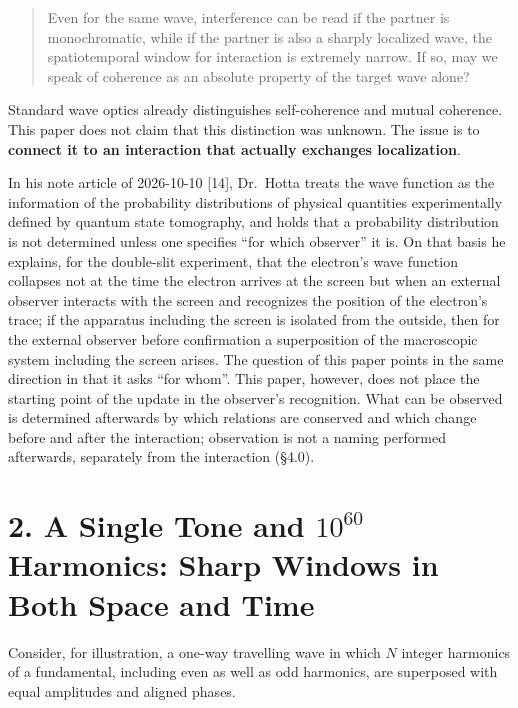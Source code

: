 \documentclass[
  a4paper,
]{article}
\begin{document}
\begin{quote}
Even for the same wave, interference can be read if the partner is
monochromatic, while if the partner is also a sharply localized wave,
the spatiotemporal window for interaction is extremely narrow. If so,
may we speak of coherence as an absolute property of the target wave
alone?
\end{quote}

Standard wave optics already distinguishes self-coherence and mutual
coherence. This paper does not claim that this distinction was unknown.
The issue is to \textbf{connect it to an interaction that actually
exchanges localization}.

In his note article of 2026-10-10 {[}14{]}, Dr.~Hotta treats the wave
function as the information of the probability distributions of physical
quantities experimentally defined by quantum state tomography, and holds
that a probability distribution is not determined unless one specifies
``for which observer'' it is. On that basis he explains, for the
double-slit experiment, that the electron's wave function collapses not
at the time the electron arrives at the screen but when an external
observer interacts with the screen and recognizes the position of the
electron's trace; if the apparatus including the screen is isolated from
the outside, then for the external observer before confirmation a
superposition of the macroscopic system including the screen arises. The
question of this paper points in the same direction in that it asks
``for whom''. This paper, however, does not place the starting point of
the update in the observer's recognition. What can be observed is
determined afterwards by which relations are conserved and which change
before and after the interaction; observation is not a naming performed
afterwards, separately from the interaction (§4.0).

\section{\texorpdfstring{2. A Single Tone and \(10^{60}\) Harmonics:
Sharp Windows in Both Space and
Time}{2. A Single Tone and 10\^{}\{60\} Harmonics: Sharp Windows in Both Space and Time}}\label{a-single-tone-and-1060-harmonics-sharp-windows-in-both-space-and-time}

Consider, for illustration, a one-way travelling wave in which \(N\)
integer harmonics of a fundamental, including even as well as odd
harmonics, are superposed with equal amplitudes and aligned phases.
\end{document}
